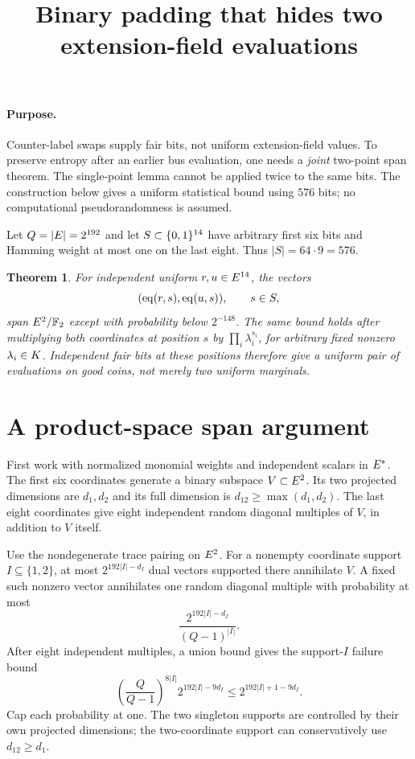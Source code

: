 \documentclass[11pt]{article}
\title{Binary padding that hides two extension-field evaluations}
\author{}
\date{}
\newtheorem{theorem}{Theorem}
\begin{document}
\maketitle
\vspace{-2em}

\paragraph{Purpose.} Counter-label swaps supply fair bits, not uniform extension-field values. To preserve entropy after an earlier bus evaluation, one needs a \emph{joint} two-point span theorem. The single-point lemma cannot be applied twice to the same bits. The construction below gives a uniform statistical bound using $576$ bits; no computational pseudorandomness is assumed.

Let $Q=|E|=2^{192}$ and let $S\subset\{0,1\}^{14}$ have arbitrary first six bits and Hamming weight at most one on the last eight. Thus $|S|=64\cdot9=576$.

\begin{theorem}\label{thm:two-point-span}
For independent uniform $r,u\in E^{14}$, the vectors
\[
 (\operatorname{eq}(r,s),\operatorname{eq}(u,s)),\qquad s\in S,
\]
span $E^2/\mathbb F_2$ except with probability below $2^{-148}$. The same bound holds after multiplying both coordinates at position $s$ by $\prod_i\lambda_i^{s_i}$, for arbitrary fixed nonzero $\lambda_i\in K$. Independent fair bits at these positions therefore give a uniform pair of evaluations on good coins, not merely two uniform marginals.
\end{theorem}

\section{A product-space span argument}

First work with normalized monomial weights and independent scalars in $E^*$. The first six coordinates generate a binary subspace $V\subset E^2$. Its two projected dimensions are $d_1,d_2$ and its full dimension is $d_{12}\ge\max(d_1,d_2)$. The last eight coordinates give eight independent random diagonal multiples of $V$, in addition to $V$ itself.

Use the nondegenerate trace pairing on $E^2$. For a nonempty coordinate support $I\subseteq\{1,2\}$, at most $2^{192|I|-d_I}$ dual vectors supported there annihilate $V$. A fixed such nonzero vector annihilates one random diagonal multiple with probability at most
\[
 \frac{2^{192|I|-d_I}}{(Q-1)^{|I|}}.
\]
After eight independent multiples, a union bound gives the support-$I$ failure bound
\[
 \left(\frac Q{Q-1}\right)^{8|I|}2^{192|I|-9d_I}
 \le 2^{192|I|+1-9d_I}.
\]
Cap each probability at one. The two singleton supports are controlled by their own projected dimensions; the two-coordinate support can conservatively use $d_{12}\ge d_1$.
\end{document}
